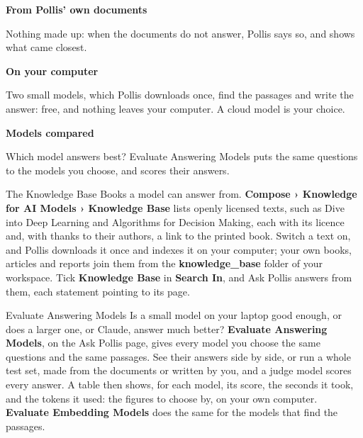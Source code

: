\documentclass[10pt,a4paper]{article}
\begin{document}
\vspace{3mm}
\begin{tcbraster}[raster columns=3, raster equal height, raster column skip=3mm,
  enhanced, colback=pale, colframe=pale, boxrule=0pt, sharp corners,
  left=5pt,right=5pt,top=6pt,bottom=6pt, fontupper=\small\raggedright]
\begin{tcolorbox}{\color{deepamber}\Large\faBookOpen}\par\smallskip
  {\color{navy}\bfseries From Pollis' own documents}\par Nothing made up: when the documents do not answer, Pollis
  says so, and shows what came closest.\end{tcolorbox}
\begin{tcolorbox}{\color{deepamber}\Large\faLaptop}\par\smallskip
  {\color{navy}\bfseries On your computer}\par Two small models, which Pollis downloads once, find the passages and
  write the answer: free, and nothing leaves your computer. A cloud model is your choice.\end{tcolorbox}
\begin{tcolorbox}{\color{deepamber}\Large\faBalanceScale}\par\smallskip
  {\color{navy}\bfseries Models compared}\par Which model answers best? Evaluate Answering Models puts the same questions to the
  models you choose, and scores their answers.\end{tcolorbox}
\end{tcbraster}

\vspace{3mm}
\begin{pbox}{The Knowledge Base}
Books a model can answer from. \textbf{Compose › Knowledge for AI Models › Knowledge Base} lists openly licensed
texts, such as Dive into Deep Learning and Algorithms for Decision Making, each with its licence and, with thanks to
their authors, a link to the printed book. Switch a text on, and Pollis downloads it once and indexes it on your
computer; your own books, articles and reports join them from the \textbf{knowledge\_base} folder of your workspace. Tick
\textbf{Knowledge Base} in \textbf{Search In}, and Ask Pollis answers from them, each statement pointing to its page.
\end{pbox}

\vspace{3mm}
\begin{pbox}{Evaluate Answering Models}
Is a small model on your laptop good enough, or does a larger one, or Claude, answer much better? \textbf{Evaluate
Answering Models}, on the Ask Pollis page, gives every model you choose the same questions and the same passages. See their
answers side by side, or run a whole test set, made from the documents or written by you, and a judge model scores
every answer. A table then shows, for each model, its score, the seconds it took, and the tokens it used: the figures
to choose by, on your own computer. \textbf{Evaluate Embedding Models} does the same for the models that find
the passages.
\end{pbox}
\end{document}
